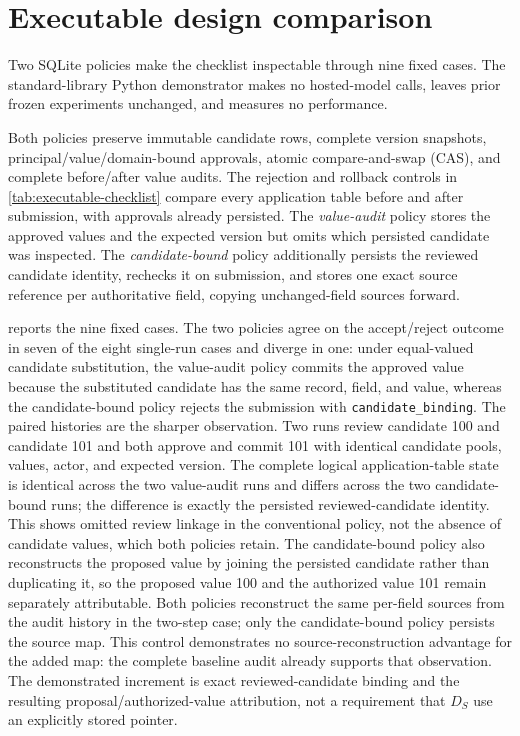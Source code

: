 \documentclass[preprint,12pt,authoryear]{elsarticle}
\newcommand{\code}[1]{\nolinkurl{#1}}
\begin{document}
\section{Executable design comparison}
\label{sec:supp-executable}

Two SQLite policies make the checklist inspectable through nine fixed cases.
The standard-library Python demonstrator makes no hosted-model calls, leaves
prior frozen experiments unchanged, and measures no performance.

Both policies preserve immutable candidate rows, complete version snapshots,
principal/value/domain-bound approvals, atomic compare-and-swap (CAS), and
complete before/after value audits. The rejection and rollback controls in
\cref{tab:executable-checklist} compare every application table before and after
submission, with approvals already persisted. The
\emph{value-audit} policy stores the approved values and the expected version
but omits which persisted candidate was inspected. The \emph{candidate-bound}
policy additionally persists the reviewed candidate identity, rechecks it on
submission, and stores one exact source reference per authoritative field,
copying unchanged-field sources forward.



 reports the nine fixed cases. The two policies
agree on the accept/reject outcome in seven of the eight single-run cases and
diverge in one: under equal-valued candidate substitution, the value-audit
policy commits the approved value because the substituted candidate has the
same record, field, and value, whereas the candidate-bound policy rejects the
submission with \code{candidate_binding}. The paired histories are the sharper
observation. Two runs review candidate 100 and candidate 101 and both approve
and commit 101 with identical candidate pools, values, actor, and expected
version. The complete logical application-table state is identical across the two
value-audit runs and differs across the two candidate-bound runs; the
difference is exactly the persisted reviewed-candidate identity. This shows
omitted review linkage in the conventional policy, not the absence of
candidate values, which both policies retain. The candidate-bound policy also
reconstructs the proposed value by joining the persisted candidate rather than
duplicating it, so the proposed value 100 and the authorized value 101 remain
separately attributable. Both policies reconstruct the same per-field sources
from the audit history in the two-step case; only the candidate-bound policy
persists the source map. This control demonstrates no source-reconstruction
advantage for the added map: the complete baseline audit already supports that
observation. The demonstrated increment is exact reviewed-candidate binding and
the resulting proposal/authorized-value attribution, not a requirement that
$D_S$ use an explicitly stored pointer.
\end{document}
